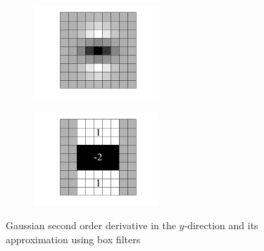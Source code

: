 \begin{figure}
    \centering
    \begin{subfigure}{0.24\textwidth}
        \centering
        \includegraphics[width=\textwidth]{Figures/surf/y_gauss.png}
        \label{fig:y_gauss}
    \end{subfigure}
    \begin{subfigure}{0.24\textwidth}
        \centering
        \includegraphics[width=\textwidth]{Figures/surf/y_box.png}
        \label{fig:y_box}
    \end{subfigure}
    \caption[Gaussian second order derivative in the $y$-direction and its approximation using box filters]{Gaussian second order derivative in the $y$-direction and its approximation using box filters \cite{Bay2006}}

    \label{fig:Gauss_box_y}
\end{figure}

